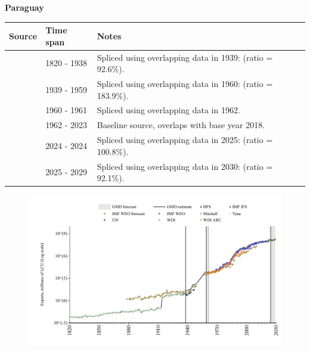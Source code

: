 \documentclass[12pt,a4paper,landscape]{article}
\begin{document}
\begin{adjustbox}{max totalsize={\paperwidth}{\paperheight},center}
\begin{minipage}[t][\textheight][t]{\textwidth}
\vspace*{0.5cm}
{}
\begin{center}
{\Large\bfseries Paraguay}
\end{center}
\vspace{0.5cm}
\begin{table}[H]
\centering
\small
\begin{tabular}{|l|l|l|}
\hline
\textbf{Source} & \textbf{Time span} & \textbf{Notes} \\
\hline
\rowcolor{white}\cite{Tena}& 1820 - 1938 &Spliced using overlapping data in 1939: (ratio = 92.6\%).\\
\rowcolor{lightgray}\cite{Mitchell}& 1939 - 1959 &Spliced using overlapping data in 1960: (ratio = 183.9\%).\\
\rowcolor{white}\cite{WDI_ARC}& 1960 - 1961 &Spliced using overlapping data in 1962.\\
\rowcolor{lightgray}\cite{WDI}& 1962 - 2023 &Baseline source, overlaps with base year 2018.\\
\rowcolor{white}\cite{IMF_IFS}& 2024 - 2024 &Spliced using overlapping data in 2025: (ratio = 100.8\%).\\
\rowcolor{lightgray}\cite{IMF_WEO_forecast}& 2025 - 2029 &Spliced using overlapping data in 2030: (ratio = 92.1\%).\\
\hline
\end{tabular}
\end{table}
\begin{figure}[H]
\centering
\includegraphics[width=\textwidth,height=0.6\textheight,keepaspectratio]{graphs/PRY_exports.pdf}
\end{figure}
\end{minipage}
\end{adjustbox}
\end{document}
